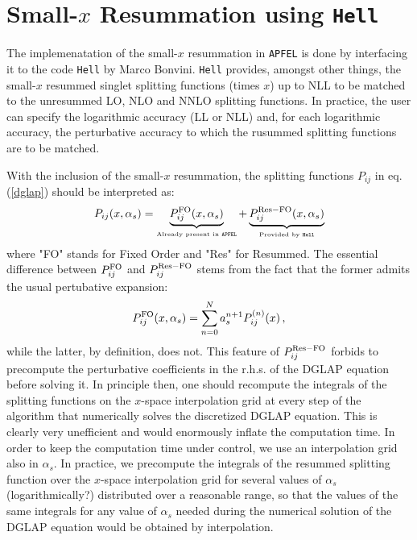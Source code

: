 \documentclass[10pt,a4paper]{article}
\begin{document}
\section{Small-$x$ Resummation using {\tt Hell}}

The implemenatation of the small-$x$ resummation in {\tt APFEL} is
done by interfacing it to the code {\tt Hell} by Marco Bonvini. {\tt Hell}
provides, amongst other things, the small-$x$ resummed singlet splitting
functions (times $x$) up to NLL to be matched to the unresummed LO, NLO and NNLO
splitting functions. In practice, the user can specify the logarithmic
accuracy (LL or NLL) and, for each logarithmic accuracy, the
perturbative accuracy to which the rusummed splitting functions are to
be matched.

With the inclusion of the small-$x$ resummation, the splitting
functions ${P}_{ij}$ in eq. (\ref{dglap}) should be interpreted
as:
\begin{equation}
{P}_{ij}(x,\alpha_s) = \underbrace{{P}_{ij}^{\rm
    FO}(x,\alpha_s)}_{\mbox{\tiny Already present in {\tt APFEL}}} +
\underbrace{{P}_{ij}^{\rm Res-FO}(x,\alpha_s)}_{\mbox{\tiny Provided
    by {\tt Hell}}}
\end{equation}
where "FO" stands for Fixed Order and "Res" for Resummed.
The essential difference between ${P}_{ij}^{\rm FO}$ and
${P}_{ij}^{\rm Res-FO}$ stems from the fact that the former admits the
usual pertubative expansion:
\begin{equation}
{P}_{ij}^{\rm FO}(x,\alpha_s) = \sum_{n=0}^N a_s^{n+1} P_{ij}^{(n)}(x)\,,
\end{equation}
while the latter, by definition, does not. This feature of
${P}_{ij}^{\rm Res-FO}$ forbids to precompute the perturbative
coefficients in the r.h.s. of the DGLAP equation before solving it. In principle then,
one should recompute the integrals of the splitting functions on the $x$-space
interpolation grid at every step of the algorithm that numerically
solves the discretized DGLAP equation. This is clearly very
unefficient and would enormously inflate the computation time. In
order to keep the computation time under control, we use
an interpolation grid also in $\alpha_s$. In practice, we precompute
the integrals of the resummed splitting function over the $x$-space
interpolation grid for several values of $\alpha_s$ (logarithmically?)
distributed over a reasonable range, so that the values of the same
integrals for any value of $\alpha_s$ needed during the numerical
solution of the DGLAP equation  would be obtained by interpolation.
\end{document}
